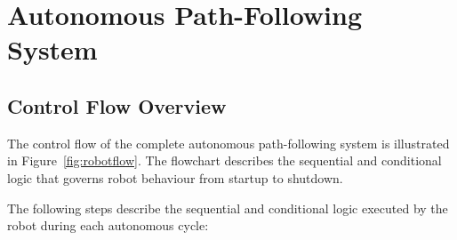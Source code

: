 \section{Autonomous Path-Following System}

\subsection{Control Flow Overview}

The control flow of the complete autonomous path-following system is
illustrated in Figure~\ref{fig:robotflow}. The flowchart describes the
sequential and conditional logic that governs robot behaviour from
startup to shutdown.

The following steps describe the sequential and conditional logic
executed by the robot during each autonomous cycle:

